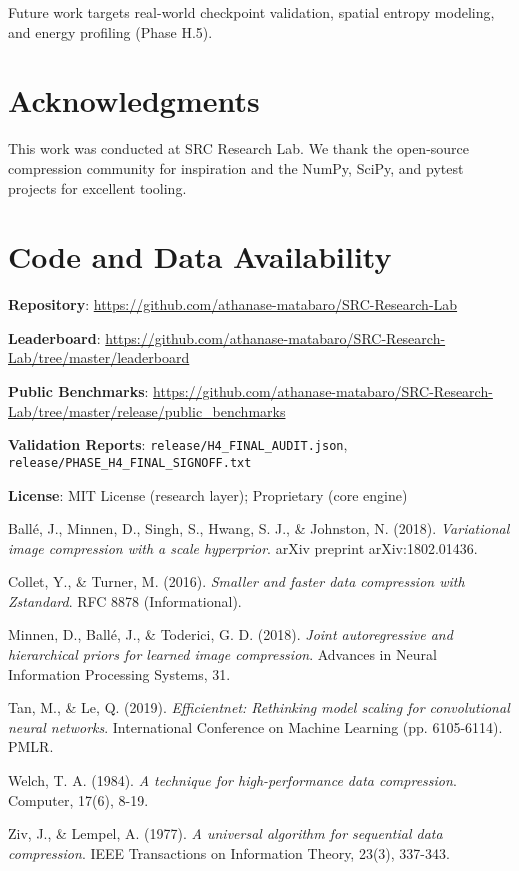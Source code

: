 \documentclass[11pt,twocolumn]{article}
\begin{document}
Future work targets real-world checkpoint validation, spatial entropy modeling, and energy profiling (Phase H.5).

\section*{Acknowledgments}

This work was conducted at SRC Research Lab. We thank the open-source compression community for inspiration and the NumPy, SciPy, and pytest projects for excellent tooling.

\section*{Code and Data Availability}

\textbf{Repository}: \url{https://github.com/athanase-matabaro/SRC-Research-Lab}

\textbf{Leaderboard}: \url{https://github.com/athanase-matabaro/SRC-Research-Lab/tree/master/leaderboard}

\textbf{Public Benchmarks}: \url{https://github.com/athanase-matabaro/SRC-Research-Lab/tree/master/release/public_benchmarks}

\textbf{Validation Reports}: \texttt{release/H4\_FINAL\_AUDIT.json}, \texttt{release/PHASE\_H4\_FINAL\_SIGNOFF.txt}

\textbf{License}: MIT License (research layer); Proprietary (core engine)

\begin{thebibliography}{9}

Ballé, J., Minnen, D., Singh, S., Hwang, S. J., \& Johnston, N. (2018).
\textit{Variational image compression with a scale hyperprior}.
arXiv preprint arXiv:1802.01436.

Collet, Y., \& Turner, M. (2016).
\textit{Smaller and faster data compression with Zstandard}.
RFC 8878 (Informational).

Minnen, D., Ballé, J., \& Toderici, G. D. (2018).
\textit{Joint autoregressive and hierarchical priors for learned image compression}.
Advances in Neural Information Processing Systems, 31.

Tan, M., \& Le, Q. (2019).
\textit{Efficientnet: Rethinking model scaling for convolutional neural networks}.
International Conference on Machine Learning (pp. 6105-6114). PMLR.

Welch, T. A. (1984).
\textit{A technique for high-performance data compression}.
Computer, 17(6), 8-19.

Ziv, J., \& Lempel, A. (1977).
\textit{A universal algorithm for sequential data compression}.
IEEE Transactions on Information Theory, 23(3), 337-343.

\end{thebibliography}
\end{document}

